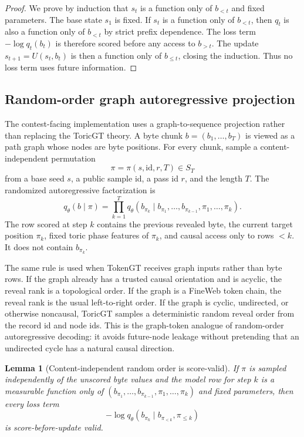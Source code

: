 \documentclass[11pt]{article}
\theoremstyle{definition}
\theoremstyle{plain}
\newtheorem{lemma}[definition]{Lemma}
\theoremstyle{remark}
\numberwithin{equation}{section}
\begin{document}
\begin{proof}
We prove by induction that $s_t$ is a function only of $b_{<t}$ and fixed parameters.  The base state $s_1$ is fixed.  If $s_t$ is a function only of $b_{<t}$, then $q_t$ is also a function only of $b_{<t}$ by strict prefix dependence.  The loss term $-\log q_t(b_t)$ is therefore scored before any access to $b_{>t}$.  The update $s_{t+1}=U(s_t,b_t)$ is then a function only of $b_{\le t}$, closing the induction.  Thus no loss term uses future information.
\end{proof}

\subsection{Random-order graph autoregressive projection}

The contest-facing implementation uses a graph-to-sequence projection rather than replacing the ToricGT theory.  A byte chunk $b=(b_1,\ldots,b_T)$ is viewed as a path graph whose nodes are byte positions.  For every chunk, sample a content-independent permutation
\begin{equation}
  \pi=\pi(s,\mathrm{id},r,T)\in S_T
\end{equation}
from a base seed $s$, a public sample id, a pass id $r$, and the length $T$.  The randomized autoregressive factorization is
\begin{equation}
  q_\theta(b\mid \pi)=\prod_{k=1}^T q_\theta\left(b_{\pi_k}\mid b_{\pi_1},\ldots,b_{\pi_{k-1}},\pi_1,\ldots,\pi_k\right).
\end{equation}
The row scored at step $k$ contains the previous revealed byte, the current target position $\pi_k$, fixed toric phase features of $\pi_k$, and causal access only to rows $<k$.  It does not contain $b_{\pi_k}$.

The same rule is used when TokenGT receives graph inputs rather than byte rows.
If the graph already has a trusted causal orientation and is acyclic, the reveal
rank is a topological order.  If the graph is a FineWeb token chain, the reveal
rank is the usual left-to-right order.  If the graph is cyclic, undirected, or
otherwise noncausal, ToricGT samples a deterministic random reveal order from
the record id and node ids.  This is the graph-token analogue of random-order
autoregressive decoding: it avoids future-node leakage without pretending that
an undirected cycle has a natural causal direction.

\begin{lemma}[Content-independent random order is score-valid]
If $\pi$ is sampled independently of the unscored byte values and the model row for step $k$ is a measurable function only of $(b_{\pi_1},\ldots,b_{\pi_{k-1}},\pi_1,\ldots,\pi_k)$ and fixed parameters, then every loss term
\begin{equation}
  -\log q_\theta(b_{\pi_k}\mid b_{\pi_{<k}},\pi_{\le k})
\end{equation}
is score-before-update valid.
\end{lemma}
\end{document}
